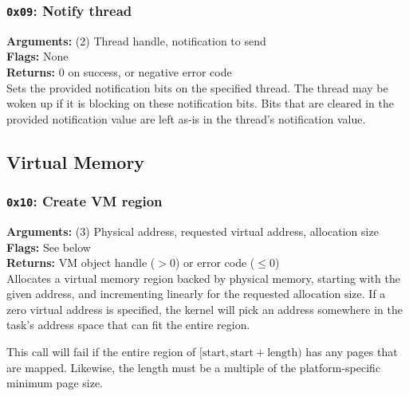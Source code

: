 \documentclass[11pt]{article}
\begin{document}
\subsubsection{{\tt 0x09}: Notify thread}
\textbf{Arguments:} (2) Thread handle, notification to send \\
\textbf{Flags:} None \\
\textbf{Returns:} 0 on success, or negative error code \\

Sets the provided notification bits on the specified thread. The thread may be woken up if it is blocking on these notification bits. Bits that are cleared in the provided notification value are left as-is in the thread's notification value.



\newpage
\subsection{Virtual Memory}
\subsubsection{{\tt 0x10}: Create VM region}
\textbf{Arguments:} (3) Physical address, requested virtual address, allocation size  \\
\textbf{Flags:} See below \\
\textbf{Returns:} VM object handle ($>0$) or error code ($\leq0$) \\

Allocates a virtual memory region backed by physical memory, starting with the given address, and incrementing linearly for the requested allocation size.  If a zero virtual address is specified, the kernel will pick an address somewhere in the task's address space that can fit the entire region.

This call will fail if the entire region of $[\text{start}, \text{start} + \text{length})$ has any pages that are mapped. Likewise, the length must be a multiple of the platform-specific minimum page size.
\end{document}
